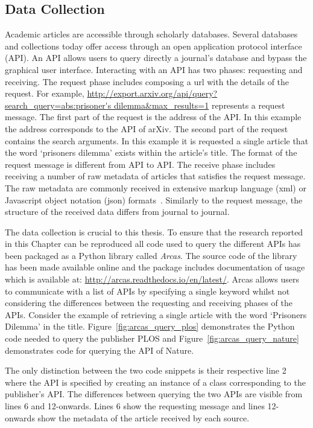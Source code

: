 \subsection{Data Collection}\label{section:data_collection_arcas}

Academic articles are accessible through scholarly databases. Several databases
and collections today offer access through an open application protocol
interface (API). An API allows users to query directly a journal's database and
bypass the graphical user interface. Interacting with an API has two phases:
requesting and receiving. The request phase includes composing a url with the
details of the request. For example,
\url{http://export.arxiv.org/api/query?search_query=abs:prisoner's
dilemma&max_results=1} represents a request message. The first part of the
request is the address of the API. In this example the address corresponds to
the API of arXiv. The second part of the request contains the search arguments.
In this example it is requested a single article that the word `prisoners dilemma' exists within
the article's title. The format of the request message is different from API to
API. The receive phase includes receiving a number of raw metadata of articles
that satisfies the request message. The raw metadata are commonly received in
extensive markup language (xml) or Javascript object notation (json)
formats~\cite{nurseitov2009}. Similarly to the request message, the structure of
the received data differs from journal
to journal.

The data collection is crucial to this thesis. To ensure that the research
reported in this Chapter can be reproduced all code used to query the different
APIs has been packaged as a Python library called \textit{Arcas}. The source
code of the library has been made available online and the package includes
documentation of usage which is available at:
\url{http://arcas.readthedocs.io/en/latest/}. Arcas allows users to communicate
with a list of APIs by specifying a single keyword whilst not considering the
differences between the requesting and receiving phases of the APIs. Consider
the example of retrieving a single article with the word `Prisoners Dilemma' in
the title. Figure~\ref{fig:arcas_query_plos} demonstrates the Python code needed
to query the publisher PLOS and Figure~\ref{fig:arcas_query_nature} demonstrates 
code for querying the API of Nature.

The only distinction between the two code snippets is their respective line 2
where the API is specified by creating an instance of a class corresponding
to the publisher's API. The differences between querying the two APIs are visible from
lines 6 and 12-onwards. Lines 6 show the requesting message and lines 12-onwards
show the metadata of the article received by each source.

